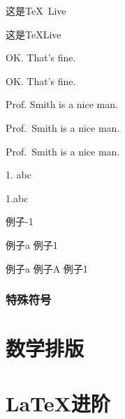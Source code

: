 \documentclass[twoside]{ctexart}
\begin{document}
            这是\TeX\ Live %

            这是\TeX\space Live %

            OK. That's fine. %

            OK\@. That's fine. %

            Prof. Smith is a nice man. %

            Prof.\ Smith is a nice man. 

            Prof.~Smith is a nice man.

            1. abc

            1.\frenchspacing abc

            例子-1

            例子a 例子1
            
            \mbox{例子}a 例子\mbox{A} \mbox{例子}\mbox{1}

        \subsubsection{特殊符号}

\section{数学排版}

\section{\LaTeX 进阶}
\end{document}
